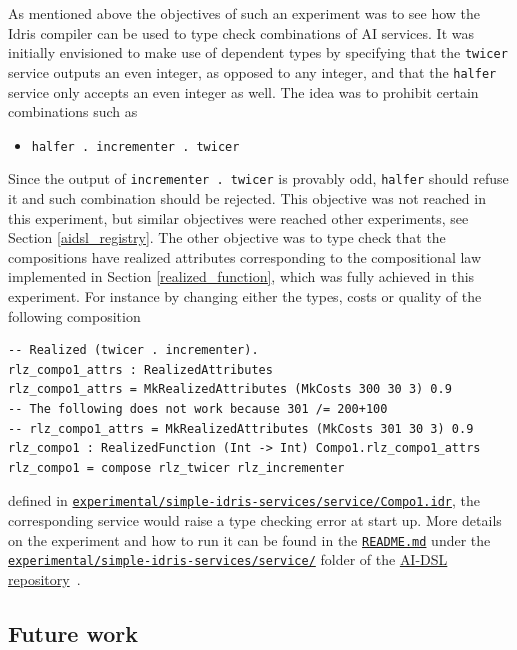 \documentclass[]{report}
\newcommand{\nil}[2][]{\todo[color=purple,author=nil, #1]{#2}}
\begin{document}
As mentioned above the objectives of such an experiment was to see how
the Idris compiler can be used to type check combinations of AI
services.  It was initially envisioned to make use of dependent types
by specifying that the \texttt{twicer} service outputs an even
integer, as opposed to any integer, and that the \texttt{halfer}
service only accepts an even integer as well.  The idea was to
prohibit certain combinations such as
\begin{itemize}
\item \texttt{halfer . incrementer . twicer}
\end{itemize}
Since the output of \texttt{incrementer . twicer} is provably odd,
\texttt{halfer} should refuse it and such combination should be
rejected.  This objective was not reached in this experiment, but
similar objectives were reached other experiments, see Section
\ref{aidsl_registry}\nil{Add ref to Sam's work}.  The other objective
was to type check that the compositions have realized attributes
corresponding to the compositional law implemented in Section
\ref{realized_function}, which was fully achieved in this experiment.
For instance by changing either the types, costs or quality of the
following composition
\begin{verbatim}
-- Realized (twicer . incrementer).
rlz_compo1_attrs : RealizedAttributes
rlz_compo1_attrs = MkRealizedAttributes (MkCosts 300 30 3) 0.9
-- The following does not work because 301 /= 200+100
-- rlz_compo1_attrs = MkRealizedAttributes (MkCosts 301 30 3) 0.9
rlz_compo1 : RealizedFunction (Int -> Int) Compo1.rlz_compo1_attrs
rlz_compo1 = compose rlz_twicer rlz_incrementer
\end{verbatim}
defined in
\href{https://github.com/singnet/ai-dsl/blob/master/experimental/simple-idris-services/service/Compo1.idr}{\texttt{experimental/simple-idris-services/service/Compo1.idr}},
the corresponding service would raise a type checking error at start
up.  More details on the experiment and how to run it can be found in
the
\href{https://github.com/singnet/ai-dsl/blob/master/experimental/simple-idris-services/README.md}{\texttt{README.md}}
under the
\href{https://github.com/singnet/ai-dsl/blob/master/experimental/simple-idris-services/}{\texttt{experimental/simple-idris-services/service/}}
folder of the \href{https://github.com/singnet/ai-dsl/}{AI-DSL
  repository}~\cite{AIDSLRepo}.

\subsection{Future work}
\end{document}
